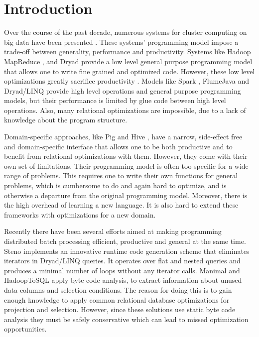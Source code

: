 \section{Introduction}
\label{sec:introduction}

Over the course of the past decade, numerous systems for cluster computing on big data have been
presented \cite{dean_mapreduce:_2008, yu_dryadlinq:_2008-1, olston_pig_2008-1,
thusoo_hive_2010-1, spark-nsdi}. These systems' programming model impose a
trade-off between generality, performance and productivity. Systems like Hadoop
MapReduce \cite{hadoop}, and Dryad \cite{isard_dryad:_2007} provide a low level
general purpose programming model that allows one to write fine grained and optimized
code. However, these low level optimizations greatly sacrifice productivity
\cite{chambers_flumejava:_2010}. Models like Spark \cite{spark-nsdi}, FlumeJava
\cite{chambers_flumejava:_2010} and Dryad/LINQ \cite{yu_dryadlinq:_2008-1}
provide high level operations and general purpose programming models, but their
performance is limited by glue code between high level operations. Also, many
relational optimizations are impossible, due to a lack of knowledge about the
program structure.

Domain-specific approaches, like Pig \cite{olston_pig_2008-1} and Hive
\cite{thusoo_hive_2010-1}, have a narrow, side-effect free and
domain-specific interface that allows one to be both productive and to benefit from relational optimizations with them.
However, they come with their own set of limitations. Their programming model is
often too specific for a wide range of problems. 
This requires one to write their own functions for general problems, which is cumbersome to do and again hard to optimize, and is otherwise a departure from the original programming model.
Moreover, there is the high overhead of
learning a new language.
It is also hard to extend these frameworks with optimizations for a new domain.

Recently there have been several efforts aimed at making programming
distributed batch processing efficient, productive and general at the same time.
Steno \cite{murray_steno:_2011} implements an innovative runtime code
generation scheme that eliminates iterators in Dryad/LINQ queries. It operates over flat
and nested queries and produces a minimal number of loops without any iterator
calls. Manimal \cite{jahani_automatic_2011} and HadoopToSQL
\cite{iu_hadooptosql:_2010} apply byte code analysis, to extract information
about unused data columns and selection conditions. The reason for doing this is to gain enough
knowledge to apply common relational database optimizations for projection and
selection. However, since these solutions use static byte code analysis they
must be safely conservative which can lead to missed optimization opportunities.

